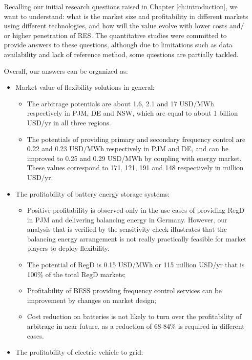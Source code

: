 Recalling our initial research questions raised in Chapter \ref{ch:introduction}, we want to understand: what is the market size and profitability in different markets using different technologies, and how will the value evolve with lower costs and/ or higher penetration of  RES. The quantitative studies were committed to provide answers to these questions, although due to limitations such as data availability and lack of reference method, some questions are partially tackled.

Overall, our answers can be organized as:

\begin{itemize}
	\item Market value of flexibility solutions in general:
	\begin{itemize}
		\item The arbitrage potentials are about 1.6, 2.1 and 17 USD/MWh respectively in PJM, DE and NSW, which are equal to about 1 billion USD/yr in all three regions.
		\item The potentials of providing primary and secondary frequency control  are  0.22 and 0.23 USD/MWh respectively in PJM and DE, and can be improved to 0.25 and 0.29 USD/MWh by coupling with energy market. These values correspond to 171, 121, 191 and 148 respectively in million USD/yr.
	\end{itemize}
	\item The profitability of battery energy storage systems:
	\begin{itemize}
		\item Positive profitability is observed only in the use-cases of providing RegD in PJM and delivering balancing energy in Germany. However, our analysis that is verified by the sensitivity check illustrates that the balancing energy arrangement is not really practically feasible for market players to deploy flexibility. 
		\item The potential of RegD is 0.15 USD/MWh or 115 million USD/yr that is 100\% of the total RegD markets;
		\item Profitability of BESS providing frequency control services can be improvement by changes on market design;
		\item Cost reduction on batteries is not likely to turn over the profitability of arbitrage in near future, as a reduction of 68-84\% is required in different cases.
	\end{itemize}
	\item The profitability of electric vehicle to grid:
	\begin{itemize}

\end{itemize}
\end{itemize}
